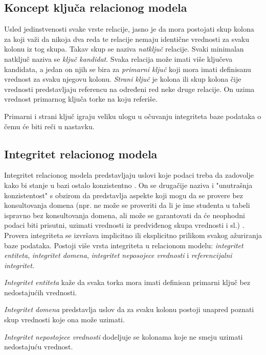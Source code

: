\documentclass[12pt,oneside]{memoir}
\begin{document}
\subsection{Koncept ključa relacionog modela}

Usled jedinstvenosti svake vrste relacije, jasno je da mora postojati skup kolona za koji važi da nikoja dva reda te relacije nemaju identične vrednosti za svaku kolonu iz tog skupa. Takav skup se naziva \textit{natključ} relacije. Svaki minimalan natključ naziva se \textit{ključ kandidat}. Svaka relacija može imati više ključeva kandidata, a jedan on njih se bira za  \textit{primarni ključ} koji mora imati definisanu vrednost za svaku njegovu kolonu.
\textit{Strani ključ} je kolona ili skup kolona čije vrednosti predstavljaju referencu na određeni red neke druge relacije. On uzima vrednost primarnog ključa torke na koju referiše. 

Primarni i strani ključ igraju veliku ulogu u očuvanju integriteta baze podataka o čemu će biti reči u nastavku.

\subsection{Integritet relacionog modela}

Integritet relacionog modela predstavljaju uslovi koje podaci treba da zadovolje kako bi stanje u bazi ostalo konzistentno \cite{URBP} . On se drugačije naziva i "unutrašnja konzistentost" s obzirom da predstavlja aspekte koji mogu da se provere bez konsultovanja domena (npr. ne može se proveriti da li je ime studenta u tabeli ispravno bez konsultovanja domena, ali može se garantovati da će neophodni podaci biti prisutni, uzimati vrednosti iz predviđenog skupa vrednosti i sl.) . Provera integriteta se izvršava implicitno ili eksplicitno prilikom svakog ažuriranja baze podataka. Postoji više vrsta integriteta u relacionom modelu:  \textit{integritet entiteta}, \textit{integritet domena}, \textit{integritet neposojece vrednosti} i \textit{referencijalni integritet}.

 \textit{Integritet entiteta} kaže da svaka torka mora imati definisan primarni ključ bez nedostajućih vrednosti.

\textit{Integritet domena} predstavlja uslov da za svaku kolonu postoji unapred poznati skup vrednosti koje ona može uzimati.

\textit{Integritet nepostojece vrednosti} dodeljuje se kolonama koje  ne smeju uzimati nedostajuću vrednost.
\end{document}
